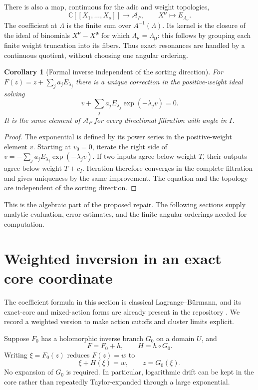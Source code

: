 \documentclass[11pt,a4paper]{article}
\numberwithin{equation}{section}
\newtheorem{corollary}[theorem]{Corollary}
\theoremstyle{definition}
\theoremstyle{remark}
\newcommand{\C}{\mathbb C}
\newcommand{\nn}{\boldsymbol\nu}
\newcommand{\mm}{\boldsymbol\mu}
\begin{document}
There is also a map, continuous for the adic and weight topologies,
\[
 \C[[X_1,\ldots,X_s]]\longrightarrow\mathcal A_P,
 \qquad X^{\nn}\longmapsto E_{\Lambda_{\nn}}.
\]
The coefficient at $\Lambda$ is the finite sum over $A^{-1}(\Lambda)$.
Its kernel is the closure of the ideal of binomials
$X^{\nn}-X^{\mm}$ for which $\Lambda_{\nn}=\Lambda_{\mm}$: this follows by
grouping each finite weight truncation into its fibers. Thus exact resonances
are handled by a continuous quotient, without choosing one angular ordering.

\begin{corollary}[Formal inverse independent of the sorting direction]\label{cor:formal-completion}
For $F(z)=z+\sum_j a_jE_{\lambda_j}$ there is a unique correction in the
positive-weight ideal solving
\begin{equation}\label{eq:completed-inverse}
 v+\sum_j a_jE_{\lambda_j}\exp(-\lambda_jv)=0.
\end{equation}
It is the same element of $\mathcal A_P$ for every directional filtration
with angle in $I$.
\end{corollary}

\begin{proof}
The exponential is defined by its power series in the positive-weight
element $v$. Starting at $v_0=0$, iterate the right side of
$v=-\sum_j a_jE_{\lambda_j}\exp(-\lambda_jv)$.
If two inputs agree below weight $T$, their outputs agree below weight
$T+c_I$. Iteration therefore converges in the complete filtration and gives
uniqueness by the same improvement. The equation and the topology are
independent of the sorting direction.
\end{proof}

This is the algebraic part of the proposed repair. The following sections
supply analytic evaluation, error estimates, and the finite angular
orderings needed for computation.

\section{Weighted inversion in an exact core coordinate}\label{sec:weighted}

The coefficient formula in this section is classical Lagrange--B\"urmann,
and its exact-core and mixed-action forms are already present in the
repository \cite{repo-canonical,repo-support,repo-stokes}. We record a
weighted version to make action cutoffs and cluster limits explicit.

Suppose $F_0$ has a holomorphic inverse branch $G_0$ on a domain $U$, and
\[
 F=F_0+h,\qquad H=h\circ G_0.
\]
Writing $\xi=F_0(z)$ reduces $F(z)=w$ to
\begin{equation}\label{eq:core-reduction}
 \xi+H(\xi)=w,\qquad z=G_0(\xi).
\end{equation}
No expansion of $G_0$ is required. In particular, logarithmic drift can be
kept in the core rather than repeatedly Taylor-expanded through a large
exponential.
\end{document}
